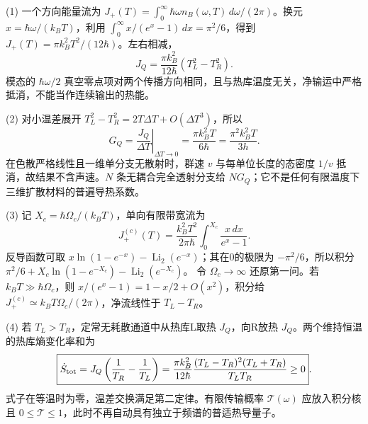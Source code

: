 (1) 一个方向能量流为 \(J_+(T)=\int_0^\infty \hbar\omega n_B(\omega,T)\,d\omega/(2\pi)\)。换元 \(x=\hbar\omega/(k_BT)\)，利用
\(\int_0^\infty x/(e^x-1)\,dx=\pi^2/6\)，得到 \(J_+(T)=\pi k_B^2T^2/(12\hbar)\)。左右相减，
\[
\boxed{J_Q=\frac{\pi k_B^2}{12\hbar}(T_L^2-T_R^2)} .
\]
模态的 \(\hbar\omega/2\) 真空零点项对两个传播方向相同，且与热库温度无关，净输运中严格抵消，不能当作连续输出的热能。

(2) 对小温差展开 \(T_L^2-T_R^2=2T\Delta T+O(\Delta T^3)\)，所以
\[
\boxed{G_Q=\left.\frac{J_Q}{\Delta T}\right|_{\Delta T\to0}
=\frac{\pi k_B^2T}{6\hbar}=\frac{\pi^2k_B^2T}{3h}}.
\]
在色散严格线性且一维单分支无散射时，群速 \(v\) 与每单位长度的态密度 \(1/v\) 抵消，故结果不含声速。\(N\) 条无耦合完全透射分支给 \(NG_Q\)；它不是任何有限温度下三维扩散材料的普遍导热系数。

(3) 记 \(X_c=\hbar\Omega_c/(k_BT)\)，单向有限带宽流为
\[
J_+^{(c)}(T)=\frac{k_B^2T^2}{2\pi\hbar}
\int_0^{X_c}\frac{x\,dx}{e^x-1}.
\]
反导函数可取 \(x\ln(1-e^{-x})-\operatorname{Li}_2(e^{-x})\)；其在0的极限为 \(-\pi^2/6\)，所以积分
\(\pi^2/6+X_c\ln(1-e^{-X_c})-\operatorname{Li}_2(e^{-X_c})\)。
令 \(\Omega_c\to\infty\) 还原第一问。若 \(k_BT\gg\hbar\Omega_c\)，则 \(x/(e^x-1)=1-x/2+O(x^2)\)，积分给 \(J_+^{(c)}\simeq k_BT\Omega_c/(2\pi)\)，净流线性于 \(T_L-T_R\)。

(4) 若 \(T_L>T_R\)，定常无耗散通道中从热库L取热 \(J_Q\)，向R放热 \(J_Q\)。两个维持恒温的热库熵变化率和为
\[
\boxed{\dot S_{\rm tot}=J_Q\left(\frac1{T_R}-\frac1{T_L}\right)
=\frac{\pi k_B^2}{12\hbar}\frac{(T_L-T_R)^2(T_L+T_R)}{T_LT_R}\ge0}.
\]
式子在等温时为零，温差交换满足第二定律。有限传输概率 \(\mathcal T(\omega)\) 应放入积分核且 \(0\le\mathcal T\le1\)，此时不再自动具有独立于频谱的普适热导量子。
